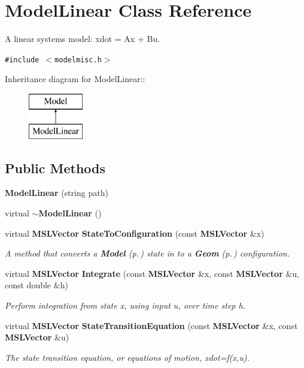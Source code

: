 \section{Model\-Linear  Class Reference}
\label{classModelLinear}
A linear systems model: xdot = Ax + Bu. 


{\tt \#include $<$modelmisc.h$>$}

Inheritance diagram for Model\-Linear::\begin{figure}[H]
\begin{center}
\leavevmode
\includegraphics[height=2cm]{classModelLinear}
\end{center}
\end{figure}
\subsection*{Public Methods}
\begin{CompactItemize}
\item 
{\bf Model\-Linear} (string path)
\item 
virtual {\bf $\sim$Model\-Linear} ()
\item 
virtual {\bf MSLVector} {\bf State\-To\-Configuration} (const {\bf MSLVector} \&x)
\begin{CompactList}\small\item\em A method that converts a {\bf Model} {\rm (p.\,\pageref{classModel})} state in to a {\bf Geom} {\rm (p.\,\pageref{classGeom})} configuration.\item\end{CompactList}\item 
virtual {\bf MSLVector} {\bf Integrate} (const {\bf MSLVector} \&x, const {\bf MSLVector} \&u, const double \&h)
\begin{CompactList}\small\item\em Perform integration from state x, using input u, over time step h.\item\end{CompactList}\item 
virtual {\bf MSLVector} {\bf State\-Transition\-Equation} (const {\bf MSLVector} \&x, const {\bf MSLVector} \&u)
\begin{CompactList}\small\item\em The state transition equation, or equations of motion, xdot=f(x,u).\item\end{CompactList}\end{CompactItemize}
